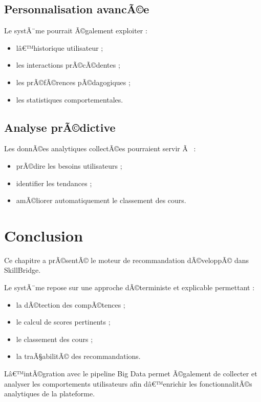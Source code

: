 ﻿\documentclass[12pt,a4paper]{report}
\begin{document}
\subsection{Personnalisation avancÃ©e}

Le systÃ¨me pourrait Ã©galement exploiter :
\begin{itemize}
    \item lâ€™historique utilisateur ;
    \item les interactions prÃ©cÃ©dentes ;
    \item les prÃ©fÃ©rences pÃ©dagogiques ;
    \item les statistiques comportementales.
\end{itemize}

\subsection{Analyse prÃ©dictive}

Les donnÃ©es analytiques collectÃ©es pourraient servir Ã  :
\begin{itemize}
    \item prÃ©dire les besoins utilisateurs ;
    \item identifier les tendances ;
    \item amÃ©liorer automatiquement le classement des cours.
\end{itemize}

\section{Conclusion}

Ce chapitre a prÃ©sentÃ© le moteur de recommandation dÃ©veloppÃ© dans SkillBridge.

Le systÃ¨me repose sur une approche dÃ©terministe et explicable permettant :
\begin{itemize}
    \item la dÃ©tection des compÃ©tences ;
    \item le calcul de scores pertinents ;
    \item le classement des cours ;
    \item la traÃ§abilitÃ© des recommandations.
\end{itemize}

Lâ€™intÃ©gration avec le pipeline Big Data permet Ã©galement de collecter et analyser les comportements utilisateurs afin dâ€™enrichir les fonctionnalitÃ©s analytiques de la plateforme.
\end{document}
